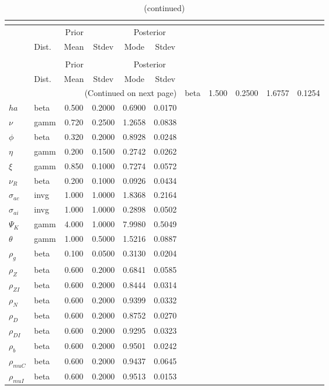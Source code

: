  
\begin{center}
\begin{longtable}{llcccc} 
\caption{Results from posterior maximization (parameters)}\\
 \label{Table:Posterior:1}\\
\toprule 
  & \multicolumn{3}{c}{Prior}  &  \multicolumn{2}{c}{Posterior} \\
  \cmidrule(r{.75em}){2-4} \cmidrule(r{.75em}){5-6}
  & Dist. & Mean  & Stdev & Mode & Stdev \\ 
\midrule \endfirsthead 
\caption{(continued)}\\
 \bottomrule 
  & \multicolumn{3}{c}{Prior}  &  \multicolumn{2}{c}{Posterior} \\
  \cmidrule(r{.75em}){2-4} \cmidrule(r{.75em}){5-6}
  & Dist. & Mean  & Stdev & Mode & Stdev \\ 
\midrule \endhead 
\bottomrule \multicolumn{6}{r}{(Continued on next page)}\endfoot 
\bottomrule\endlastfoot 
${\sigma}$ & beta &   1.500 & 0.2500 &   1.6757 &  0.1254 \\ 
${ha}$ & beta &   0.500 & 0.2000 &   0.6900 &  0.0170 \\ 
$\nu$ & gamm &   0.720 & 0.2500 &   1.2658 &  0.0838 \\ 
${\phi}$ & beta &   0.320 & 0.2000 &   0.8928 &  0.0248 \\ 
${\eta}$ & gamm &   0.200 & 0.1500 &   0.2742 &  0.0262 \\ 
$\xi$ & gamm &   0.850 & 0.1000 &   0.7274 &  0.0572 \\ 
${\nu_R}$ & beta &   0.200 & 0.1000 &   0.0926 &  0.0434 \\ 
${\sigma_{ac}}$ & invg &   1.000 & 1.0000 &   1.8368 &  0.2164 \\ 
${\sigma_{ai}}$ & invg &   1.000 & 1.0000 &   0.2898 &  0.0502 \\ 
${\Psi_{K}}$ & gamm &   4.000 & 1.0000 &   7.9980 &  0.5049 \\ 
${\theta}$ & gamm &   1.000 & 0.5000 &   1.5216 &  0.0887 \\ 
${\rho_g}$ & beta &   0.100 & 0.0500 &   0.3130 &  0.0204 \\ 
${\rho_Z}$ & beta &   0.600 & 0.2000 &   0.6841 &  0.0585 \\ 
${\rho_{ZI}}$ & beta &   0.600 & 0.2000 &   0.8444 &  0.0314 \\ 
${\rho_N}$ & beta &   0.600 & 0.2000 &   0.9399 &  0.0332 \\ 
${\rho_D}$ & beta &   0.600 & 0.2000 &   0.8752 &  0.0270 \\ 
${\rho_{DI}}$ & beta &   0.600 & 0.2000 &   0.9295 &  0.0323 \\ 
${\rho_b}$ & beta &   0.600 & 0.2000 &   0.9501 &  0.0242 \\ 
${\rho_{muC}}$ & beta &   0.600 & 0.2000 &   0.9437 &  0.0645 \\ 
${\rho_{muI}}$ & beta &   0.600 & 0.2000 &   0.9513 &  0.0153 \\ 
\end{longtable}
 \end{center}
